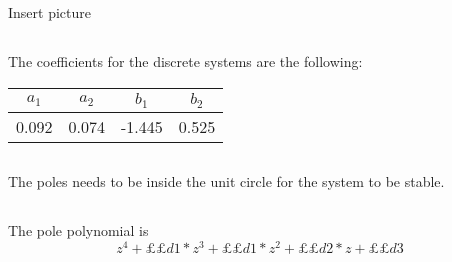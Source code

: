 \documentclass[12pt,a4paper]{article}
\begin{document}
\subsection{}%

\subsection{}%
Insert picture
\subsection{}%
The coefficients for the discrete systems are the following:
\begin{center}
	\begin{tabular}{| c | c | c | c |}
	\hline
	$a_1$ & $a_2$ & $b_1$ & $b_2$ \\
	\hline
	0.092 & 0.074 & -1.445 & 0.525 \\
	\hline
	\end{tabular}
\end{center}

\subsection{}%
The poles needs to be inside the unit circle for the system to be stable.

\subsection{}%
The pole polynomial is
	\begin{equation}
		z^4+££d1*z^3+££d1*z^2+££d2*z +££d3
	\end{equation}
\end{document}

